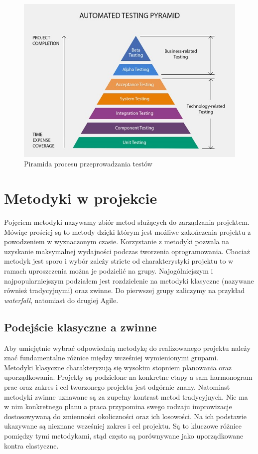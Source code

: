 \documentclass[oneside,polski,logo]{amuthesis}
\begin{document}
\begin{figure}[h]
	\centering
	\includegraphics[width=15cm]{images/hyps/test-diagram.jpg}
	\caption{Piramida procesu przeprowadzania testów}
\end{figure}

\section {Metodyki w projekcie}
Pojęciem metodyki nazywamy zbiór metod służących do zarządzania projektem. Mówiąc prościej są to metody dzięki którym jest możliwe zakończenia projektu z powodzeniem w wyznaczonym czasie. Korzystanie z metodyki pozwala na uzyskanie maksymalnej wydajności podczas tworzenia oprogramowania. Chociaż metodyk jest sporo i wybór zależy stricte od charakterystyki projektu to w ramach uproszczenia można je podzielić na grupy.  Najogólniejszym i najpopularniejszym podziałem jest rozdzielenie na metodyki klasyczne (nazywane również tradycyjnymi) oraz zwinne. Do pierwszej grupy zaliczymy na przykład \emph{waterfall}, natomiast do drugiej Agile.\\

\subsection {Podejście klasyczne a zwinne}
Aby umiejętnie wybrać odpowiednią metodykę do realizowanego projektu należy znać fundamentalne różnice między wcześniej wymienionymi grupami. \\

Metodyki klasyczne charakteryzują się wysokim stopniem planowania oraz uporządkowania. Projekty są podzielone na konkretne etapy a sam harmonogram prac oraz zakres i cel tworzonego projektu jest odgórnie znany. Natomiast metodyki zwinne uznawane są za zupełny kontrast metod tradycyjnych. Nie ma w nim konkretnego planu a praca przypomina swego rodzaju improwizacje dostosowywaną do zmienności okoliczności oraz ich losowości. Na ich podstawie ukazywane są nieznane wcześniej zakres i cel projektu. Są to kluczowe różnice pomiędzy tymi metodykami, stąd często są porównywane jako uporządkowane kontra elastyczne.\\
\end{document}
